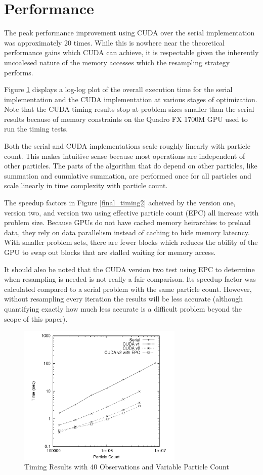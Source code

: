 \documentclass{article}
\begin{document}
\section{Performance}
The peak performance improvement using CUDA over the serial implementation was approximately 20 times. While this is nowhere near the theoretical performance gains which CUDA can achieve, it is respectable given the inherently uncoalesed nature of the memory accesses which the resampling strategy performs.

Figure \ref{final_timing1} displays a log-log plot of the overall execution time for the serial implementation and the CUDA implementation at various stages of optimization. Note that the CUDA timing results stop at problem sizes smaller than the serial results because of memory constraints on the Quadro FX 1700M GPU used to run the timing tests.

Both the serial and CUDA implementations scale roughly linearly with particle count. This makes intuitive sense because most operations are independent of other particles. The parts of the algorithm that do depend on other particles, like summation and cumulative summation, are performed once for all particles and scale linearly in time complexity with particle count.

The speedup factors in Figure \ref{final_timing2} acheived by the version one, version two, and version two using effective particle count (EPC) all increase with problem size. Because GPUs do not have cached memory heirarchies to preload data, they rely on data parallelism instead of caching to hide memory latecncy. With smaller problem sets, there are fewer blocks which reduces the ability of the GPU to swap out blocks that are stalled waiting for memory access.

It should also be noted that the CUDA version two test using EPC to determine when resampling is needed is not really a fair comparison. Its speedup factor was calculated compared to a serial problem with the same particle count. However, without resampling every iteration the results will be less accurate (although quantifying exactly how much less accurate is a difficult problem beyond the scope of this paper).

\begin{figure}
\centering
\includegraphics[width=0.7\textwidth]{data/timing_results.png}
\caption{Timing Results with 40 Observations and Variable Particle Count}
\label{final_timing1}
\end{figure}
\end{document}
